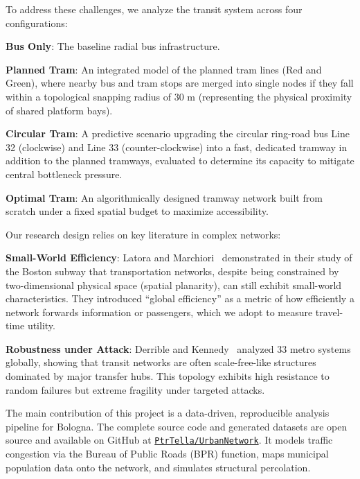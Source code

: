 \documentclass[12pt, a4paper]{article}
\let\olditemize\itemize
\let\endolditemize\enditemize
\renewenvironment{itemize}{\olditemize\setlength{\itemsep}{0pt}\setlength{\parskip}{0pt}\setlength{\parsep}{0pt}\setlength{\topsep}{0pt}\setlength{\partopsep}{0pt}}{\endolditemize}
\let\oldenumerate\enumerate
\let\endoldenumerate\endenumerate
\renewenvironment{enumerate}{\oldenumerate\setlength{\itemsep}{0pt}\setlength{\parskip}{0pt}\setlength{\parsep}{0pt}\setlength{\topsep}{0pt}\setlength{\partopsep}{0pt}}{\endoldenumerate}
\begin{document}
To address these challenges, we analyze the transit system across four configurations:
\begin{enumerate}
    \item \textbf{Bus Only}: The baseline radial bus infrastructure.
    \item \textbf{Planned Tram}: An integrated model of the planned tram lines (Red and Green), where nearby bus and tram stops are merged into single nodes if they fall within a topological snapping radius of $30\text{ m}$ (representing the physical proximity of shared platform bays).
    \item \textbf{Circular Tram}: A predictive scenario upgrading the circular ring-road bus Line 32 (clockwise) and Line 33 (counter-clockwise) into a fast, dedicated tramway in addition to the planned tramways, evaluated to determine its capacity to mitigate central bottleneck pressure.
    \item \textbf{Optimal Tram}: An algorithmically designed tramway network built from scratch under a fixed spatial budget to maximize accessibility.
\end{enumerate}

Our research design relies on key literature in complex networks:
\begin{itemize}
    \item \textbf{Small-World Efficiency}: Latora and Marchiori~\cite{latora2} demonstrated in their study of the Boston subway that transportation networks, despite being constrained by two-dimensional physical space (spatial planarity), can still exhibit small-world characteristics. They introduced ``global efficiency'' as a metric of how efficiently a network forwards information or passengers, which we adopt to measure travel-time utility.
    \item \textbf{Robustness under Attack}: Derrible and Kennedy~\cite{derrible} analyzed 33 metro systems globally, showing that transit networks are often scale-free-like structures dominated by major transfer hubs. This topology exhibits high resistance to random failures but extreme fragility under targeted attacks.
\end{itemize}

The main contribution of this project is a data-driven, reproducible analysis pipeline for Bologna. The complete source code and generated datasets are open source and available on GitHub at \href{https://github.com/PtrTella/UrbanNetwork}{\texttt{PtrTella/UrbanNetwork}}. It models traffic congestion via the Bureau of Public Roads (BPR) function, maps municipal population data onto the network, and simulates structural percolation.
\end{document}
